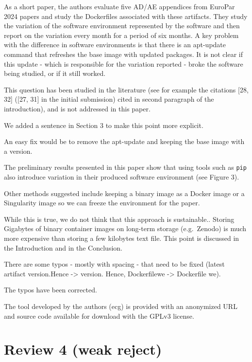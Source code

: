 \documentclass[%
	11pt,
	final,
]{article}
\makeatletter
\newcommand{\eg}{e.g.\@}
\makeatother
\begin{document}
As a short paper, the authors evaluate five AD/AE appendices from EuroPar 2024 papers and study the Dockerfiles associated with these artifacts.
They study the variation of the software environment represented by the software and then report on the variation every month for a period of six months.
A key problem with the difference in software environments is that there is an apt-update command that refreshes the base image with updated packages.
It is not clear if this update - which is responsible for the variation reported - broke the software being studied, or if it still worked.
\begin{review-answer}
  This question has been studied in the literature (see for example the citations [28, 32] ([27, 31] in the initial submission) cited in second paragraph of the introduction), and is not addressed in this paper.


We added a sentence in Section 3 to make this point more explicit.
\end{review-answer}
An easy fix would be to remove the apt-update and keeping the base image with a version.
\begin{review-answer}
  The preliminary results presented in this paper show that using tools such as \texttt{pip} also introduce variation in their produced software environment (see Figure 3).
\end{review-answer}
Other methods suggested include keeping a binary image as a Docker image or a Singularity image so we can freeze the environment for the paper.
\begin{review-answer}
  While this is true, we do not think that this approach is sustainable..
  Storing Gigabytes of binary container images on long-term storage (\eg\ Zenodo) is much more expensive than storing a few kilobytes text file.
  This point is discussed in the Introduction and in the Conclusion.
\end{review-answer}
There are some typos - mostly with spacing - that need to be fixed (latest artifact version.Hence -> version. Hence, Dockerfilewe -> Dockerfile we).
\begin{review-answer}
  The typos have been corrected.
\end{review-answer}
The tool developed by the authors (ecg) is provided with an anonymized URL and source code available for download with the GPLv3 license.


\section{Review 4 (weak reject)}
\end{document}
